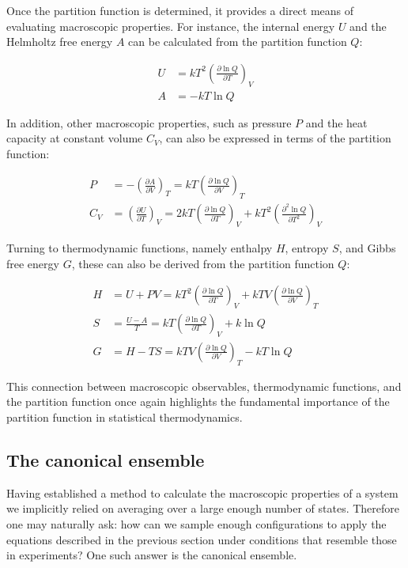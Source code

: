 Once the partition function is determined, it provides a direct means of evaluating macroscopic properties. For instance, the internal energy $U$ and the Helmholtz free energy $A$ can be calculated from the partition function $Q$:

\begin{align}
    U &= kT^2 \left(\frac{\partial \ln Q}{\partial T}\right)_V \\
    A &= -kT\ln Q
\end{align}

In addition, other macroscopic properties, such as pressure $P$ and the heat capacity at constant volume $C_V$, can also be expressed in terms of the partition function:

\begin{align}
    P &= -\left(\frac{\partial A}{\partial V}\right)_T = kT\left(\frac{\partial \ln Q}{\partial V}\right)_T \\
    C_V &= \left(\frac{\partial U}{\partial T}\right)_V = 2kT\left(\frac{\partial \ln Q}{\partial T}\right)_V + kT^2\left(\frac{\partial^2 \ln Q}{\partial T^2}\right)_V
\end{align}

Turning to thermodynamic functions, namely enthalpy $H$, entropy $S$, and Gibbs free energy $G$, these can also be derived from the partition function $Q$:

\begin{align}
    H &= U + PV = kT^2\left(\frac{\partial \ln Q}{\partial T}\right)_V + kTV\left(\frac{\partial \ln Q}{\partial V}\right)_T \\
    S &= \frac{U-A}{T} = kT\left(\frac{\partial \ln Q}{\partial T}\right)_V + k\ln Q \\
    G &= H - TS = kTV\left(\frac{\partial \ln Q}{\partial V}\right)_T - kT\ln Q
\end{align}

This connection between macroscopic observables, thermodynamic functions, and the partition function once again highlights the fundamental importance of the partition function in statistical thermodynamics.



\subsection{The canonical ensemble}
Having established a method to calculate the macroscopic properties of a system we implicitly relied on averaging over a large enough number of states. Therefore one may naturally ask: how can we sample enough configurations to apply the equations described in the previous section under conditions that resemble those in experiments? One such answer is the canonical ensemble.

